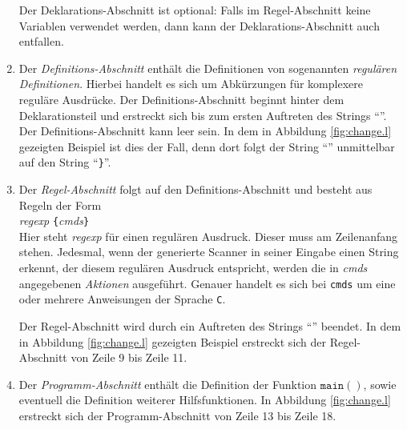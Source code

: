 \begin{enumerate}
      Der Deklarations-Abschnitt ist optional: Falls im Regel-Abschnitt keine Variablen
      verwendet werden, dann kann der Deklarations-Abschnitt auch entfallen.
\item Der \emph{Definitions-Abschnitt} enth\"alt die Definitionen von sogenannten \emph{regul\"aren Definitionen}.
      Hierbei handelt es sich um Abk\"urzungen f\"ur komplexere regul\"are Ausdr\"ucke.
      Der Definitions-Abschnitt beginnt hinter dem Deklarationsteil und erstreckt sich bis zum
      ersten Auftreten des Strings ``\texttt{}''.
      Der Definitions-Abschnitt kann leer sein.  In dem in Abbildung \ref{fig:change.l}
      gezeigten Beispiel ist dies der Fall, denn dort folgt der String
      ``\texttt{}'' unmittelbar auf den String ``\texttt{\}}''.
\item Der \emph{Regel-Abschnitt} folgt auf den Definitions-Abschnitt und besteht aus Regeln
      der Form
      \\[0.2cm]
      \hspace*{1.3cm} \textsl{regexp} \texttt{\{}\textsl{cmds}\texttt{\}}
      \\[0.2cm]
      Hier steht \textsl{regexp}\/ f\"ur einen regul\"aren Ausdruck. Dieser muss am Zeilenanfang
      stehen.  Jedesmal, wenn der generierte Scanner in seiner Eingabe einen String
      erkennt, der diesem regul\"aren Ausdruck entspricht, werden die in \textsl{cmds}\/
      angegebenen \emph{Aktionen} ausgef\"uhrt.  Genauer handelt es sich bei \texttt{cmds} um eine
      oder mehrere Anweisungen der Sprache \texttt{C}.

      Der Regel-Abschnitt wird durch ein Auftreten des Strings
      ``\texttt{}''
      beendet.  In dem in Abbildung \ref{fig:change.l}
      gezeigten Beispiel erstreckt sich der Regel-Abschnitt von Zeile 9 bis Zeile 11.
\item Der \emph{Programm-Abschnitt} enth\"alt die Definition der Funktion $\texttt{main}()$,
      sowie eventuell die Definition weiterer Hilfsfunktionen.
      In Abbildung \ref{fig:change.l} erstreckt sich der Programm-Abschnitt von Zeile 13
      bis Zeile 18.
\end{enumerate}

